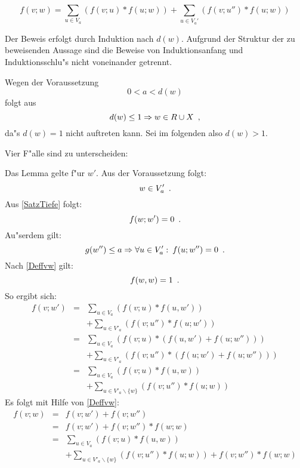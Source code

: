 \begin{lemma}
\label{Satz1VSBR}
    \[
       f(v;w) =
           \sum_{u\in V_a} (f(v;u) * f(u;w)) +
           \sum_{u\in V_a'} (f(v;u'') * f(u;w))
    \]
\end{lemma}
\begin{beweis}
    Der Beweis erfolgt durch Induktion nach $d(w)$. Aufgrund der
    Struktur der zu beweisenden Aussage sind die Beweise von
    Induktionsanfang und Induktionsschlu"s nicht voneinander 
    getrennt.
    
    Wegen der Voraussetzung \[ 0 < a < d(w) \] folgt aus 
    \[ d(w) \leq 1 \Rightarrow w \in R \cup X \mbox{\hspace{0.5em},} \]
    da"s $d(w)= 1$ nicht auftreten kann. Sei im folgenden also $d(w)>1$.

    Vier F"alle sind zu unterscheiden:
    \begin{MyDescription}
        Das Lemma gelte f"ur $w'$.
        Aus der Voraussetzung folgt:
        \[ w \in V'_a \mbox{\hspace{0.5em}.} \]
        Aus \ref{SatzTiefe} folgt:
        \[ f(w;w') = 0 \mbox{\hspace{0.5em}.} \]
        Au"serdem gilt:
        \[ g(w'') \leq a \Rightarrow
           \forall u \in V'_a: \: f(u;w'') = 0 \mbox{\hspace{0.5em}.}
        \]
        Nach \ref{Deffvw} gilt: \[ f(w,w) = 1 \mbox{\hspace{0.5em}.} \]
        So ergibt sich:
        \begin{eqnarray*}
            f(v;w') & = &
                \sum_{u \in V_a} (f(v;u) * f(u,w')) \\
              & & + \sum_{u \in V'_a} (f(v;u'') * f(u;w')) \\
            & = &
                \sum_{u \in V_a} (f(v;u) * (f(u,w') + f(u;w''))) \\
              & & + \sum_{u \in V'_a} (f(v;u'') * (f(u;w') + f(u;w''))) \\
            & = &
                \sum_{u \in V_a} (f(v;u) * f(u,w)) \\
              & & + \sum_{u \in V'_a \backslash \{w\} } (f(v;u'') * f(u;w))
        \end{eqnarray*}
        Es folgt mit Hilfe von \ref{Deffvw}:
        \begin{eqnarray*}
            f(v;w) & = & f(v;w') + f(v;w'') \\
            & = & 
                f(v;w') + f(v;w'') * f(w;w) \\
            & = & 
                \sum_{u \in V_a} (f(v;u) * f(u,w)) \\
              & & + \sum_{u \in V'_a \backslash \{w\} }
                     (f(v;u'') * f(u;w)) + f(v;w'') * f(w;w) \\

\end{eqnarray*}
\end{MyDescription}
\end{beweis}
